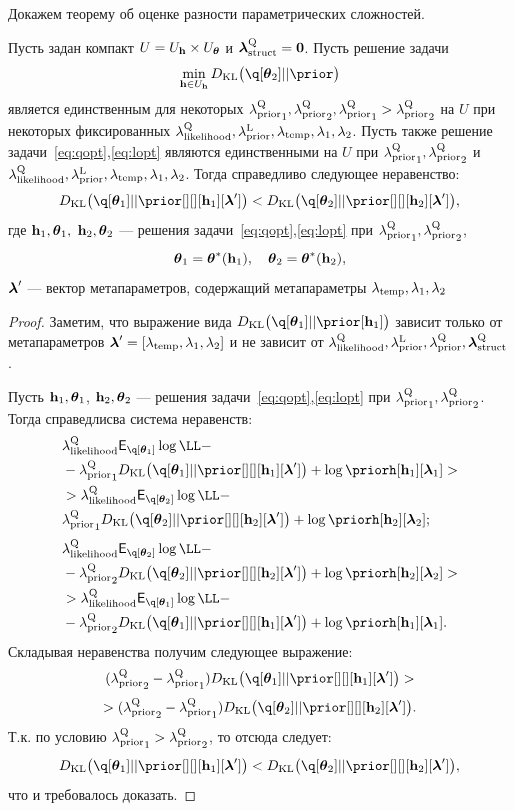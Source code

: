 Докажем теорему об оценке разности параметрических сложностей.
\begin{lemma}
\label{lem:cp}
Пусть задан компакт $U = U_{\mathbf{h}} \times U_{\boldsymbol{\theta}}$ и  $\boldsymbol{\lambda}_\text{struct}^\text{Q}=\mathbf{0}$. Пусть решение задачи
\begin{equation}
\label{eq:cp_theorem_kl}
\min_{\h \in \Uh} \KL{\q[\teta_2]}{\prior}
\end{equation}
 является единственным для некоторых ${\lambda_\text{prior}^\text{Q}}_1, {\lambda_\text{prior}^\text{Q}}_2, {\lambda_\text{prior}^\text{Q}}_1 > {\lambda_\text{prior}^\text{Q}}_2$ на $U$ при некоторых фиксированных $\lambda_\text{likelihood}^\text{Q}, \lambda_\text{prior}^\text{L}, \lambda_{\text{temp}}, \lambda_1, \lambda_2$.
Пусть также решение задачи~\eqref{eq:qopt},\eqref{eq:lopt} являются единственными на $U$ при ${\lambda_\text{prior}^\text{Q}}_1, {\lambda_\text{prior}^\text{Q}}_2$ и $\lambda_\text{likelihood}^\text{Q}, \lambda_\text{prior}^\text{L}, \lambda_{\text{temp}}, \lambda_1, \lambda_2$.
Тогда справедливо следующее неравенство:
\[
    \KL{\q[\teta_1]}{\prior[][][\h_1][\lam']}  <   \KL{\q[\teta_2]}{\prior[][][\h_2][\lam']},
\]
где $\mathbf{h}_1, \boldsymbol{\theta}_1,$ $\mathbf{h}_2, \boldsymbol{\theta}_2$  --- решения задачи~\eqref{eq:qopt},\eqref{eq:lopt} при ${\lambda_\text{prior}^\text{Q}}_1, {\lambda_\text{prior}^\text{Q}}_2$,
$$
\boldsymbol{\theta}_1 = \boldsymbol{\theta}^{*}(\mathbf{h}_1), \quad  \boldsymbol{\theta}_2 = \boldsymbol{\theta}^{*}(\mathbf{h}_2),
$$
$\boldsymbol{\lambda}'$ --- вектор метапараметров, содержащий метапараметры $\lambda_{\text{temp}}, \lambda_1, \lambda_2$

\end{lemma}
\begin{proof}
Заметим, что выражение вида $\KL{\q[\teta_1]}{\prior[\h_1]}$ зависит только от метапараметров  $\boldsymbol{\lambda}' = [\lambda_{\text{temp}}, \lambda_1, \lambda_2]$ и не зависит от $\lambda_\text{likelihood}^\text{Q}, \lambda_\text{prior}^\text{L}, \lambda_\text{prior}^\text{Q}, \boldsymbol{\lambda}_\text{struct}^\text{Q}$.  

Пусть $\mathbf{h}_1, \boldsymbol{\theta}_1$, $\mathbf{h}_2, \boldsymbol{\theta}_2$  --- решения задачи~\eqref{eq:qopt},\eqref{eq:lopt} при ${\lambda_\text{prior}^\text{Q}}_1, {\lambda_\text{prior}^\text{Q}}_2$.
Тогда справедлисва система неравенств:
\begin{align*}
&\lamLL \E_{\q[\teta_1]}\log \LL - \\
&-{\lamCQ}_1\KL{\q[\teta_1]}{\prior[][][\h_1][\lam']} + \log\priorh[\h_1][\lam_1]> \\
&> \lamLL \E_{\q[\teta_2]}\log \LL - \\
&{\lamCQ}_1\KL{\q[\teta_2]}{\prior[][][\h_2][\lam']} + \log\priorh[\h_2][\lam_2];
\end{align*}
\begin{align*}
&\lamLL \E_{\q[\teta_2]}\log \LL - \\
&-{\lamCQ}_2\KL{\q[\teta_2]}{\prior[][][\h_2][\lam']} + \log\priorh[\h_2][\lam_2] >\\
&> \lamLL \E_{\q[\teta_1]}\log \LL -\\
&- {\lamCQ}_2\KL{\q[\teta_1]}{\prior[][][\h_1][\lam']} + \log\priorh[\h_1][\lam_1].
\end{align*}
Складывая неравенства получим следующее выражение:
\[
   ({\lamCQ}_2 - {\lamCQ}_1 )\KL{\q[\teta_1]}{\prior[][][\h_1][\lam']}  >
\]
\[
>    ({\lamCQ}_2 - {\lamCQ}_1 )\KL{\q[\teta_2]}{\prior[][][\h_2][\lam']}. 
\]
Т.к. по условию ${\lambda_\text{prior}^\text{Q}}_1 > {\lambda_\text{prior}^\text{Q}}_2$, то отсюда следует:
\[
    \KL{\q[\teta_1]}{\prior[][][\h_1][\lam']}  <   \KL{\q[\teta_2]}{\prior[][][\h_2][\lam']},
\]
что и требовалось доказать.
\end{proof}

